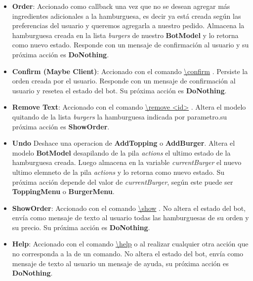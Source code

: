 \documentclass[a4paper,12pt]{article}
\begin{document}
\begin{itemize}
	\item
	\textbf{Order}: Accionado como callback una vez que no se desean agregar más ingredientes adicionales a la hamburguesa, es decir ya está creada según las preferencias del usuario y queremos agregarla a nuestro pedido. Almacena la hamburguesa creada en la lista \textit{burgers} de nuestro \textbf{BotModel} y lo retorna como nuevo estado. Responde con un mensaje de confirmación al usuario y su próxima acción es \textbf{DoNothing}.
	
	\item
	\textbf{Confirm \color{blue}(Maybe Client)\color{black}}: Accionado con el comando 
	\color{blue}\uline{\textbackslash confirm}\color{black}
	. Persiste la orden creada por el usuario. Responde con un mensaje de confirmación al usuario y resetea el estado del bot. Su próxima acción es \textbf{DoNothing}.
	
	\item
	\textbf{Remove \color{blue}Text\color{black}}: Accionado con el comando 
	\color{blue}\uline{\textbackslash remove <id>}\color{black}
	. Altera el modelo quitando de la lista \textit{burgers} la hamburguesa indicada por parametro.su próxima acción es \textbf{ShowOrder}. 
	
	\item
	\textbf{Undo}
	Deshace una operacion de \textbf{AddTopping} o \textbf{AddBurger}. Altera el modelo \textbf{BotModel} desapilando de la pila \textit{actions} el ultimo estado de la hamburguesa creada. Luego almacena en la variable \textit{currentBurger} el nuevo ultimo elemneto de la pila \textit{actions} y lo retorna como nuevo estado. Su próxima acción depende del valor de \textit{currentBurger}, según este puede ser \textbf{ToppingMenu} o \textbf{BurgerMenu}.
	
	\item
	\textbf{ShowOrder}: Accionado con el comando 
	\color{blue}\uline{\textbackslash show}\color{black}
	. No altera el estado del bot, envía como mensaje de texto al usuario todas las hamburguesas de su orden y su precio. Su próxima acción es \textbf{DoNothing}. 
	
	\item
	\textbf{Help}: Accionado con el comando 
	\color{blue}\uline{\textbackslash help}\color{black}
	 o al realizar cualquier otra acción que no corresponda a la de un comando. No altera el estado del bot, envía como mensaje de texto al usuario un mensaje de ayuda, su próxima acción es \textbf{DoNothing}. 
	
\end{itemize}
\end{document}
